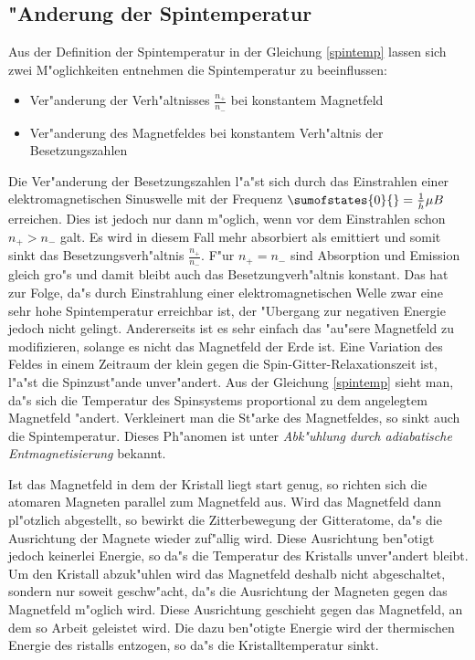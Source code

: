 \documentclass[12pt]{article}
\begin{document}
\begin{module}[id=mytemparature,uses=probability-intro]
\subsection{"Anderung der Spintemperatur}

Aus der Definition der Spintemperatur in der Gleichung \ref{spintemp}
lassen sich zwei M"oglichkeiten entnehmen die Spintemperatur zu beeinflussen:
\begin{itemize}
\item Ver"anderung der Verh"altnisses $\frac{n_{+}}{n_{-}}$ bei konstantem 
Magnetfeld
\item Ver"anderung des Magnetfeldes bei konstantem Verh"altnis der 
Besetzungszahlen
\end{itemize}


Die Ver"anderung der Besetzungszahlen l"a"st sich durch das Einstrahlen 
einer elektromagnetischen Sinuswelle mit der Frequenz
$\sumofstates{0}{}=\frac{1}{\bar h} \mu B$ erreichen. Dies ist jedoch nur dann
m"oglich, wenn vor dem Einstrahlen schon $n_{+}>n_{-}$ galt. Es wird in 
diesem Fall mehr absorbiert als emittiert und somit sinkt das 
Besetzungsverh"altnis $\frac{n_{+}}{n_{-}}$. F"ur $n_{+}=n_{-}$ sind 
Absorption und Emission gleich gro"s und damit bleibt auch das 
Besetzungverh"altnis konstant. Das hat zur Folge, da"s durch Einstrahlung
einer elektromagnetischen Welle zwar eine sehr hohe Spintemperatur 
erreichbar ist, der "Ubergang zur negativen Energie jedoch nicht gelingt. 
Andererseits ist es sehr einfach das "au"sere Magnetfeld zu modifizieren,
solange es nicht das Magnetfeld der Erde ist. Eine Variation des Feldes 
in einem Zeitraum der klein gegen die Spin-Gitter-Relaxationszeit ist,
l"a"st die Spinzust"ande unver"andert. Aus der Gleichung \ref{spintemp}
sieht man, da"s sich  die Temperatur des Spinsystems proportional zu
dem angelegtem Magnetfeld "andert. Verkleinert man die St"arke des 
Magnetfeldes, so sinkt auch die Spintemperatur. Dieses Ph"anomen ist 
unter {\em Abk"uhlung durch adiabatische Entmagnetisierung} bekannt. 

Ist das Magnetfeld in dem der Kristall liegt start genug, so richten sich 
die atomaren Magneten parallel zum Magnetfeld aus. Wird das Magnetfeld dann
pl"otzlich abgestellt, so bewirkt die Zitterbewegung der Gitteratome, da"s 
die Ausrichtung der Magnete wieder zuf"allig wird. Diese Ausrichtung 
ben"otigt jedoch keinerlei Energie, so da"s die Temperatur des Kristalls 
unver"andert bleibt. Um den Kristall abzuk"uhlen wird das Magnetfeld
deshalb nicht abgeschaltet, sondern nur soweit geschw"acht, da"s die 
Ausrichtung der Magneten gegen das Magnetfeld m"oglich wird. Diese
Ausrichtung geschieht gegen das Magnetfeld, an dem so Arbeit geleistet
wird. Die dazu ben"otigte Energie wird der thermischen Energie des 
ristalls entzogen, so da"s die Kristalltemperatur sinkt.\\
   

\end{module}
\end{document}
